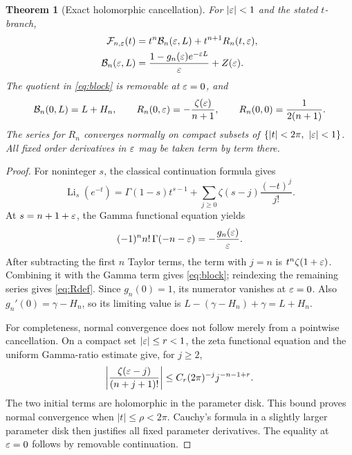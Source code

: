 \documentclass[11pt,a4paper]{article}
\numberwithin{equation}{section}
\newtheorem{theorem}{Theorem}[section]
\theoremstyle{definition}\newtheorem{definition}[theorem]{Definition}
\theoremstyle{remark}\newtheorem{remark}[theorem]{Remark}
\DeclareMathOperator{\Li}{Li}
\newcommand{\F}{\mathcal F}\newcommand{\B}{\mathcal B}
\begin{document}
\begin{theorem}[Exact holomorphic cancellation]\label{thm:normal}
For $|\varepsilon|<1$ and the stated $t$-branch,
\begin{align}
 \F_{n,\eps}(t)&=t^n\B_n(\eps,L)+t^{n+1}R_n(t,\eps),\label{eq:normal}\\
 \B_n(\eps,L)&=\frac{1-g_n(\eps)e^{-\eps L}}{\eps}+Z(\eps).
 \label{eq:block}
\end{align}
The quotient in \eqref{eq:block} is removable at $\varepsilon=0$, and
\begin{equation}\label{eq:blockzero}
 \B_n(0,L)=L+H_n,\qquad R_n(0,\eps)=-\frac{\zeta(\eps)}{n+1},\qquad
 R_n(0,0)=\frac1{2(n+1)}.
\end{equation}
The series for $R_n$ converges normally on compact subsets of
$\{|t|<2\pi,\ |\varepsilon|<1\}$. All fixed order derivatives in $\varepsilon$ may be
taken term by term there.
\end{theorem}
\begin{proof}
For noninteger $s$, the classical continuation formula gives
\[
 \Li_s(e^{-t})=\Gamma(1-s)t^{s-1}
       +\sum_{j\ge0}\zeta(s-j)\frac{(-t)^j}{j!}.
\]
At $s=n+1+\varepsilon$, the Gamma functional equation yields
\[
 (-1)^n n!\,\Gamma(-n-\varepsilon)=-\frac{g_n(\varepsilon)}{\varepsilon}.
\]
After subtracting the first $n$ Taylor terms, the term with $j=n$ is
$t^n\zeta(1+\varepsilon)$. Combining it with the Gamma term gives
\eqref{eq:block}; reindexing the remaining series gives \eqref{eq:Rdef}.
Since $g_n(0)=1$, its numerator vanishes at $\varepsilon=0$. Also
$g_n'(0)=\gamma-H_n$, so its limiting value is
$L-(\gamma-H_n)+\gamma=L+H_n$.

For completeness, normal convergence does not follow merely from a
pointwise cancellation. On a compact set $|\varepsilon|\le r<1$, the zeta
functional equation \cite{dlmf-functional} and the uniform Gamma-ratio
estimate give, for $j\ge2$,
\[
 \left|\frac{\zeta(\varepsilon-j)}{(n+j+1)!}\right|
 \le C_r(2\pi)^{-j}j^{-n-1+r}.
\]
The two initial terms are holomorphic in the parameter disk. This bound
proves normal convergence when $|t|\le\rho<2\pi$. Cauchy's formula in a
slightly larger parameter disk then justifies all fixed parameter
derivatives. The equality at $\varepsilon=0$ follows by removable continuation.
\end{proof}
\end{document}

